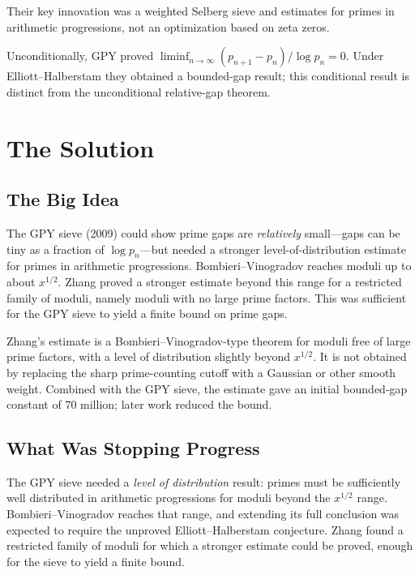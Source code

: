 Their key innovation was a weighted Selberg sieve and estimates for primes in arithmetic progressions, not an optimization based on zeta zeros.

\begin{theorem}
Unconditionally, GPY proved $\liminf_{n\to\infty}(p_{n+1}-p_n)/\log p_n=0$. Under Elliott--Halberstam they obtained a bounded-gap result; this conditional result is distinct from the unconditional relative-gap theorem.
\end{theorem}

\section{The Solution}

\subsection{The Big Idea}
The GPY sieve (2009) could show prime gaps are \emph{relatively} small---gaps can be tiny as a fraction of $\log p_n$---but needed a stronger level-of-distribution estimate for primes in arithmetic progressions. Bombieri--Vinogradov reaches moduli up to about $x^{1/2}$. Zhang proved a stronger estimate beyond this range for a restricted family of moduli, namely moduli with no large prime factors. This was sufficient for the GPY sieve to yield a finite bound on prime gaps.

Zhang's estimate is a Bombieri--Vinogradov-type theorem for moduli free of large prime factors, with a level of distribution slightly beyond $x^{1/2}$. It is not obtained by replacing the sharp prime-counting cutoff with a Gaussian or other smooth weight. Combined with the GPY sieve, the estimate gave an initial bounded-gap constant of 70 million; later work reduced the bound.

\subsection{What Was Stopping Progress}
The GPY sieve needed a \emph{level of distribution} result: primes must be sufficiently well distributed in arithmetic progressions for moduli beyond the $x^{1/2}$ range. Bombieri--Vinogradov reaches that range, and extending its full conclusion was expected to require the unproved Elliott--Halberstam conjecture. Zhang found a restricted family of moduli for which a stronger estimate could be proved, enough for the sieve to yield a finite bound.

